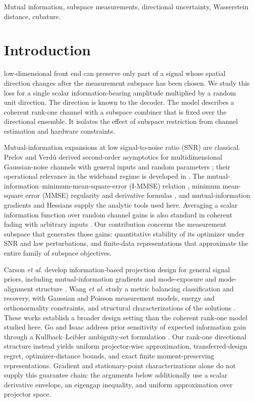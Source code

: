 \documentclass[lettersize,onecolumn]{IEEEtran}
\theoremstyle{remark}
\theoremstyle{definition}
\begin{document}
\begin{IEEEkeywords}
Mutual information, subspace measurements, directional uncertainty, Wasserstein distance, cubature.
\end{IEEEkeywords}

\section{Introduction}
 low-dimensional front end can preserve only part of a signal whose spatial direction changes after the measurement subspace has been chosen. We study this loss for a single scalar information-bearing amplitude multiplied by a random unit direction. The direction is known to the decoder. The model describes a coherent rank-one channel with a subspace combiner that is fixed over the directional ensemble. It isolates the effect of subspace restriction from channel estimation and hardware constraints.

Mutual-information expansions at low signal-to-noise ratio (SNR) are classical. Prelov and Verd\'u derived second-order asymptotics for multidimensional Gaussian-noise channels with general inputs and random parameters \cite{prelov2004}; their operational relevance in the wideband regime is developed in \cite{verdu2002}. The mutual-information--minimum-mean-square-error (I-MMSE) relation \cite{guo2005}, minimum mean-square error (MMSE) regularity and derivative formulas \cite{guo2011}, and mutual-information gradients and Hessians \cite{palomar2006,payaro2009} supply the analytic tools used here. Averaging a scalar information function over random channel gains is also standard in coherent fading with arbitrary inputs \cite{ramos2014}. Our contribution concerns the measurement subspace that generates those gains: quantitative stability of its optimizer under SNR and law perturbations, and finite-data representations that approximate the entire family of subspace objectives.

Carson \emph{et al.} develop information-based projection design for general signal priors, including mutual-information gradients and mode-exposure and mode-alignment structure \cite{carson2013}. Wang \emph{et al.} study a metric balancing classification and recovery, with Gaussian and Poisson measurement models, energy and orthonormality constraints, and structural characterizations of the solutions \cite{wang2017}. These works establish a broader design setting than the coherent rank-one model studied here. Go and Isaac address prior sensitivity of expected information gain through a Kullback--Leibler ambiguity-set formulation \cite{goisaac2022}. Our rank-one directional structure instead yields uniform projector-wise approximation, transferred-design regret, optimizer-distance bounds, and exact finite moment-preserving representations. Gradient and stationary-point characterizations alone do not supply this guarantee chain: the arguments below additionally use a scalar derivative envelope, an eigengap inequality, and uniform approximation over projector space.
\end{document}
